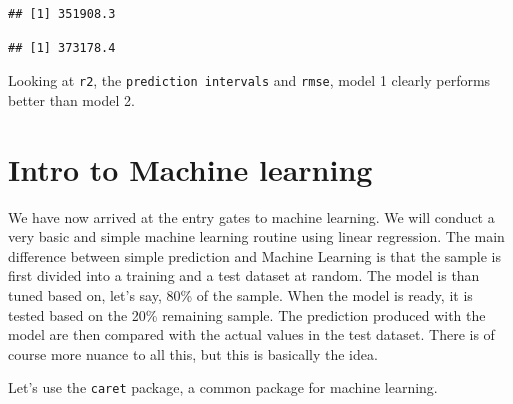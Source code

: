 \documentclass[
]{book}
\newenvironment{Shaded}{\begin{snugshade}}{\end{snugshade}}
\newcommand{\FunctionTok}[1]{\textcolor[rgb]{0.13,0.29,0.53}{\textbf{#1}}}
\newcommand{\NormalTok}[1]{#1}
\newcommand{\SpecialCharTok}[1]{\textcolor[rgb]{0.81,0.36,0.00}{\textbf{#1}}}
\begin{document}
\begin{verbatim}
## [1] 351908.3
\end{verbatim}

\begin{Shaded}
\end{Shaded}

\begin{verbatim}
## [1] 373178.4
\end{verbatim}

Looking at \texttt{r2}, the \texttt{prediction\ intervals} and \texttt{rmse}, model 1 clearly performs better than model 2.

\hypertarget{intro-to-machine-learning}{%
\section{Intro to Machine learning}\label{intro-to-machine-learning}}

We have now arrived at the entry gates to machine learning. We will conduct a very basic and simple machine learning routine using linear regression. The main difference between simple prediction and Machine Learning is that the sample is first divided into a training and a test dataset at random. The model is than tuned based on, let's say, 80\% of the sample. When the model is ready, it is tested based on the 20\% remaining sample. The prediction produced with the model are then compared with the actual values in the test dataset. There is of course more nuance to all this, but this is basically the idea.

Let's use the \texttt{caret} package, a common package for machine learning.
\end{document}

